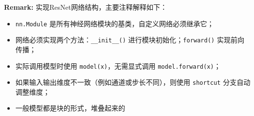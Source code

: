 \documentclass{article}
\begin{document}
\textbf{Remark:}
实现ResNet网络结构，主要注释解释如下：
\begin{itemize}
  \item \texttt{nn.Module} 是所有神经网络模块的基类，自定义网络必须继承它；
  \item 网络必须实现两个方法：\texttt{\_\_init\_\_()} 进行模块初始化；\texttt{forward()} 实现前向传播；
  \item 实际调用模型时使用 \texttt{model(x)}，无需显式调用 \texttt{model.forward(x)}；
  \item 如果输入输出维度不一致（例如通道或步长不同），则使用 \texttt{shortcut} 分支自动调整维度；
  \item 一般模型都是块的形式，堆叠起来的
\end{itemize}
\end{document}
